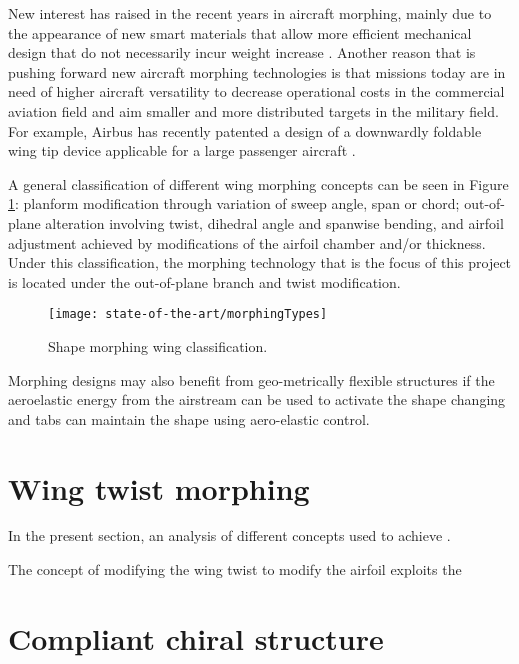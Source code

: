   New interest has raised in the recent years in aircraft morphing, mainly due to the appearance of new smart materials that allow more efficient mechanical design that do not necessarily incur weight increase \cite{Lloyd2007}. Another reason that is pushing forward new aircraft morphing technologies is that missions today are in need of higher aircraft versatility to decrease operational costs in the commercial aviation field and aim smaller and more distributed targets in the military field. For example, Airbus has recently patented a design of a downwardly foldable wing tip device applicable for a large passenger aircraft \cite{Boye2015}.

  A general classification of different wing morphing concepts can be seen in Figure \ref{fig:morphingTypes}: planform modification through variation of sweep angle, span or chord; out-of-plane alteration involving twist, dihedral angle and spanwise bending, and airfoil adjustment achieved by modifications of the airfoil chamber and/or thickness. Under this classification, the morphing technology that is the focus of this project is located under the out-of-plane branch and twist modification.
   

  \begin{figure}[!htpb]
    \centering
    \texttt{[image: state-of-the-art/morphingTypes]}
    \caption[Shape morphing wing classification]{Shape morphing wing classification. \cite{Barbarino2011}}\label{fig:morphingTypes}
  \end{figure}

  Morphing designs may also benefit from geo-metrically flexible structures if the aeroelastic energy from the airstream can be used to activate the shape changing and tabs can maintain the shape using aero-elastic control.


\section{Wing twist morphing} \label{sec:twist_state}

  In the present section, an analysis of different concepts used to achieve .

  The concept of modifying the wing twist to modify the airfoil exploits the 
\clearpage
\section{Compliant chiral structure} \label{sec:chiral_state}

